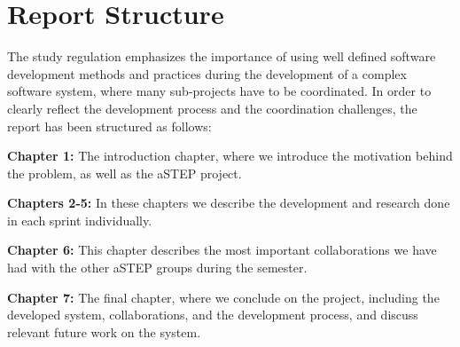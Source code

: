 \section{Report Structure} \label{sec:report_structure}
The study regulation emphasizes the importance of using well defined software development methods and practices during the development of a complex software system, where many sub-projects have to be coordinated. In order to clearly reflect the development process and the coordination challenges, the report has been structured as follows:

\textbf{Chapter 1:} The introduction chapter, where we introduce the motivation behind the problem, as well as the aSTEP project.

\textbf{Chapters 2-5:} In these chapters we describe the development and research done in each sprint individually.

\textbf{Chapter 6:} This chapter describes the most important collaborations we have had with the other aSTEP groups during the semester.

\textbf{Chapter 7:} The final chapter, where we conclude on the project, including the developed system, collaborations, and the development process, and discuss relevant future work on the system.

